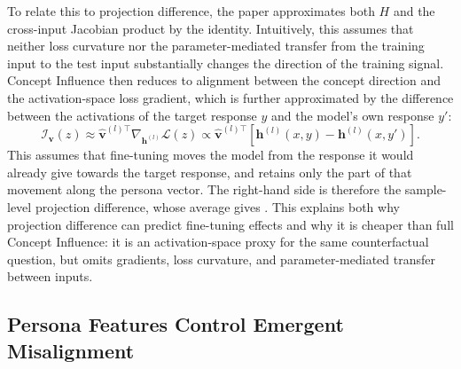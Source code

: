 To relate this to projection difference, the paper approximates both $H$ and the cross-input Jacobian product by the identity. Intuitively, this assumes that neither loss curvature nor the parameter-mediated transfer from the training input to the test input substantially changes the direction of the training signal. Concept Influence then reduces to alignment between the concept direction and the activation-space loss gradient, which is further approximated by the difference between the activations of the target response $y$ and the model's own response $y'$:
\begin{equation}
    \mathcal{I}_{\mathbf{v}}(z) \approx \hat{\mathbf{v}}^{(l)\top}\nabla_{\mathbf{h}^{(l)}}\mathcal{L}(z)
    \propto \hat{\mathbf{v}}^{(l)\top}\left[\mathbf{h}^{(l)}(x,y)-\mathbf{h}^{(l)}(x,y')\right].
    \label{eq:concept_influence_projection_difference}
\end{equation}
This assumes that fine-tuning moves the model from the response it would already give towards the target response, and retains only the part of that movement along the persona vector. The right-hand side is therefore the sample-level projection difference, whose average gives . This explains both why projection difference can predict fine-tuning effects and why it is cheaper than full Concept Influence: it is an activation-space proxy for the same counterfactual question, but omits gradients, loss curvature, and parameter-mediated transfer between inputs.

\subsection{Persona Features Control Emergent Misalignment}
\label{subsec:persona_features_em}

